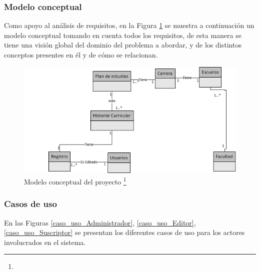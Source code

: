 	\subsubsection{Modelo conceptual}
	
	Como apoyo al análisis de requisitos,  en la Figura \ref{Figura_Modelo_conceptual} se muestra a continuación un modelo conceptual tomando en cuenta todos los requisitos, de esta manera se tiene una visión global del dominio del problema a abordar, y de los distintos conceptos presentes en él y de cómo se relacionan.
	\\
		\begin{figure}[H]
			\centering
			\includegraphics[width=1\textwidth]{images/Capitulo_3/Modelo_Conceptual.png}
			\caption[Modelo conceptual del proyecto]{Modelo conceptual del proyecto \footnote{}}
			\label{Figura_Modelo_conceptual}
		\end{figure}
	\subsubsection{Casos de uso}
	En las Figuras \ref{caso_uso_Administrador}, \ref{caso_uso_Editor}, \ref{caso_uso_Suscriptor} se presentan los diferentes casos de uso para los actores
	involucrados en el sistema.
	
